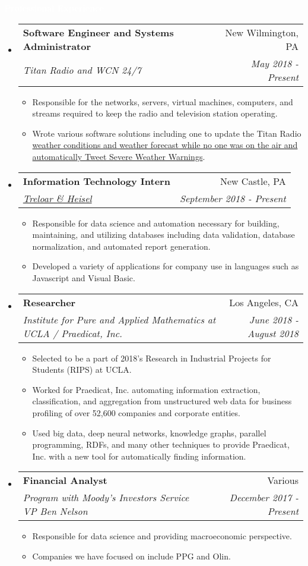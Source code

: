 \documentclass[letterpaper,11pt]{article}
\makeatletter
\newcommand{\resitem}[1]{\item #1 \vspace{-2pt}}
\newcommand{\resheading}[1]{{\large \colorbox{mypurple}{\begin{minipage}{\textwidth}{\textbf{#1 \vphantom{p\^{E}}}}\end{minipage}}}}
\newcommand{\ressubheading}[4]{
	\begin{tabular*}{7.0in}{l@{\extracolsep{\fill}}r}
		\textbf{#1} & #2 \\
		\textit{#3} & \textit{#4} \\
	\end{tabular*}\vspace{-6pt}}
\makeatother
\begin{document}
	\resheading{\textcolor{white}{Professional Experience}}
	\begin{itemize}
	\item
		\ressubheading{Software Engineer and Systems Administrator}{New Wilmington, PA}{Titan Radio and WCN 24/7}{May 2018 - Present}
		\begin{itemize}
			\resitem{Responsible for the networks, servers, virtual machines, computers, and streams required to keep the radio and television station operating.}
			\resitem{Wrote various software solutions including one to update the Titan Radio \href{https://github.com/alexandermichels/WeatherWaves}{weather conditions and weather forecast while no one was on the air and automatically Tweet Severe Weather Warnings}.}
		\end{itemize}
		\item
		\ressubheading{Information Technology Intern}{New Castle, PA}{\href{http://treloaronline.com/}{Treloar \& Heisel}}{September 2018 - Present}
		\begin{itemize}
			\resitem{Responsible for data science and automation necessary for building, maintaining, and utilizing databases including data validation, database normalization, and  automated report generation.}
			\resitem{Developed a variety of applications for company use in languages such as Javascript and Visual Basic.}
		\end{itemize}
		\item
		\ressubheading{Researcher}{Los Angeles, CA}{Institute for Pure and Applied Mathematics at UCLA / Praedicat, Inc.}{June 2018 -August 2018}
		\begin{itemize}
			\resitem{Selected to be a part of 2018’s Research in Industrial Projects for Students (RIPS) at UCLA.}
			\resitem{Worked for Praedicat, Inc. automating information extraction, classification, and aggregation from unstructured web data for business profiling of over 52,600 companies and corporate entities.}
			\resitem{Used big data, deep neural networks, knowledge graphs, parallel programming, RDFs, and many other techniques to provide Praedicat, Inc. with a new tool for automatically finding information.}
		\end{itemize}
		\item
		\ressubheading{Financial Analyst}{Various}{Program with Moody’s Investors Service VP Ben Nelson}{December 2017 - Present}
		\begin{itemize}
			\resitem{Responsible for data science and providing macroeconomic perspective.}
			\resitem{Companies we have focused on include PPG and Olin.}

\end{itemize}
\end{itemize}
\end{document}
